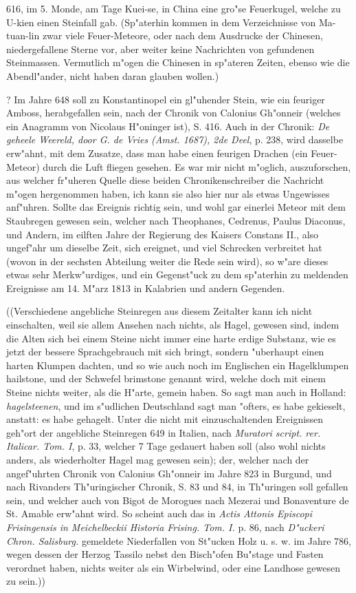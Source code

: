 \documentclass[a4paper, 11pt, oneside, polutonikogreek, german]{article}
\begin{document}
616, im 5. Monde, am Tage Kuei-se, in China eine gro"se Feuerkugel, welche zu U-kien einen Steinfall gab. (Sp"aterhin kommen in dem Verzeichnisse von Ma-tuan-lin zwar viele Feuer-Meteore, oder nach dem Ausdrucke der Chinesen, niedergefallene Sterne vor, aber weiter keine Nachrichten von gefundenen Steinmassen. Vermutlich m"ogen die Chinesen in sp"ateren Zeiten, ebenso wie die Abendl"ander, nicht haben daran glauben wollen.)

? Im Jahre 648 soll zu Konstantinopel ein gl"uhender Stein, wie ein feuriger Amboss, herabgefallen sein, nach der Chronik von Calonius Gh"onneir (welches ein Anagramm von Nicolaus H"oninger ist), S. 416. Auch in der Chronik: \emph{De geheele Weereld, door G. de Vries (Amst. 1687), 2de Deel}, p. 238, wird dasselbe erw"ahnt, mit dem Zusatze, dass man habe einen feurigen Drachen (ein Feuer-Meteor) durch die Luft fliegen gesehen. Es war mir nicht m"oglich, auszuforschen, aus welcher fr"uheren Quelle diese beiden Chronikenschreiber die Nachricht m"ogen hergenommen haben, ich kann sie also hier nur als etwas Ungewisses anf"uhren. Sollte das Ereignis richtig sein, und wohl gar einerlei Meteor mit dem Staubregen gewesen sein, welcher nach Theophanes, Cedrenus, Paulus Diaconus, und Andern, im eilften Jahre der Regierung des Kaisers Constans II., also ungef"ahr um dieselbe Zeit, sich ereignet, und viel Schrecken verbreitet hat (wovon in der sechsten Abteilung weiter die Rede sein wird), so w"are dieses etwas sehr Merkw"urdiges, und ein Gegenst"uck zu dem sp"aterhin zu meldenden Ereignisse am 14. M"arz 1813 in Kalabrien und andern Gegenden.

((Verschiedene angebliche Steinregen aus diesem Zeitalter kann ich nicht einschalten, weil sie allem Ansehen nach nichts, als Hagel, gewesen sind, indem die Alten sich bei einem Steine nicht immer eine harte erdige Substanz, wie es jetzt der bessere Sprachgebrauch mit sich bringt, sondern "uberhaupt einen harten Klumpen dachten, und so wie auch noch im Englischen ein Hagelklumpen hailstone, und der Schwefel brimstone genannt wird, welche doch mit einem Steine nichts weiter, als die H"arte, gemein haben. So sagt man auch in Holland: \emph{hagelsteenen}, und im s"udlichen Deutschland sagt man "ofters, es habe gekieselt, anstatt: es habe gehagelt. Unter die nicht mit einzuschaltenden Ereignissen geh"ort der angebliche Steinregen 649 in Italien, nach \emph{Muratori script. rer. Italicar. Tom. I}, p. 33, welcher 7 Tage gedauert haben soll (also wohl nichts anders, als wiederholter Hagel mag gewesen sein); der, welcher nach der angef"uhrten Chronik von Calonius Gh"onneir im Jahre 823 in Burgund, und nach Rivanders Th"uringischer Chronik, S. 83 und 84, in Th"uringen soll gefallen sein, und welcher auch von Bigot de Morogues nach Mezerai und Bonaventure de St. Amable erw"ahnt wird. So scheint auch das in \emph{Actis Attonis Episcopi Frisingensis in Meichelbeckii Historia Frising. Tom. I.} p. 86, nach \emph{D"uckeri Chron. Salisburg.} gemeldete Niederfallen von St"ucken Holz u. s. w. im Jahre 786, wegen dessen der Herzog Tassilo nebst den Bisch"ofen Bu"stage und Fasten verordnet haben, nichts weiter als ein Wirbelwind, oder eine Landhose gewesen zu sein.))
\end{document}
